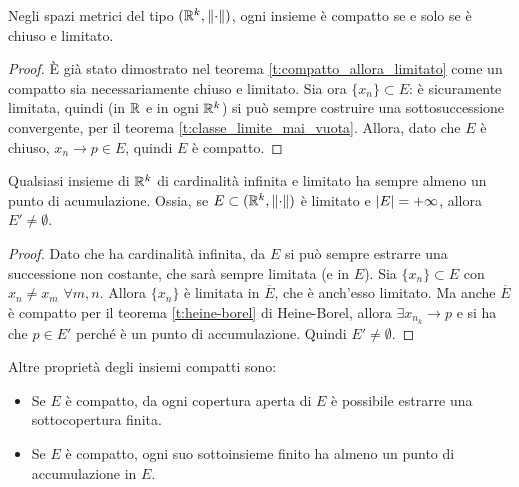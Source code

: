 \begin{teorema}
\label{t:heine-borel}
Negli spazi metrici del tipo $(\mathbb{R}^k,\left\|{\cdot}\right\|)$, ogni insieme è compatto se e solo se è chiuso e limitato.
\end{teorema}
\begin{proof}
È già stato dimostrato nel teorema \ref{t:compatto_allora_limitato} come un compatto sia necessariamente chiuso e limitato.
Sia ora $\{x_n\}\subset E$: è sicuramente limitata, quindi (in $\mathbb{R}$ e in ogni $\mathbb{R}^k$) si può sempre costruire una sottosuccessione convergente, per il teorema \ref{t:classe_limite_mai_vuota}. Allora, dato che $E$ è chiuso, $x_n\to p\in E$, quindi $E$ è compatto.
\end{proof}
\begin{teorema}
\label{t:bolzano-weierstrass}
Qualsiasi insieme di $\mathbb{R}^k$ di cardinalità infinita e limitato ha sempre almeno un punto di acumulazione. Ossia, se $E\subset(\mathbb{R}^k,\left\|{\cdot}\right\|)$ è limitato e $|E|=+\infty$, allora $E'\neq\emptyset$.
\end{teorema}
\begin{proof}
Dato che ha cardinalità infinita, da $E$ si può sempre estrarre una successione non costante, che sarà sempre limitata (e in $E$). Sia $\{x_n\}\subset E$ con $x_n\neq x_m$ $\forall m,n$. Allora $\{x_n\}$ è limitata in $\overline{E}$, che è anch'esso limitato. Ma anche $\overline{E}$ è compatto per il teorema \ref{t:heine-borel} di Heine-Borel, allora $\exists x_{n_k}\to p$ e si ha che $p\in E'$ perché è un punto di accumulazione. Quindi $E'\neq\emptyset$.
\end{proof}
Altre proprietà degli insiemi compatti sono:
\begin{itemize}
\item Se $E$ è compatto, da ogni copertura aperta di $E$ è possibile estrarre una sottocopertura finita.
\item Se $E$ è compatto, ogni suo sottoinsieme finito ha almeno un punto di accumulazione in $E$.
\end{itemize}